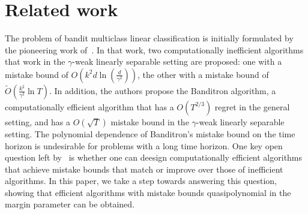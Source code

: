 \section{Related work}
\label{section:related-work}
The problem of bandit multiclass linear classification is initially formulated
 by the pioneering work of~\cite{Kakade-Shalev-Shwartz-Tewari-2008}. In that work,
 two computationally
 inefficient algorithms that work in the $\gamma$-weak linearly separable setting are proposed: one with a mistake bound of
 $O(k^2 d \ln(\frac{d}{\gamma^2}))$, the other with a mistake bound of $\tilde{O}(\frac{k^2}{\gamma^2} \ln T)$.
 In addition, the authors propose the Banditron algorithm, a computationally efficient
 algorithm that has a $O(T^{2/3})$ regret in the general setting, and has a
 $O(\sqrt{T})$ mistake bound in the $\gamma$-weak linearly separable setting.
The polynomial dependence of Banditron's mistake bound on the time horizon is undesirable
for problems with a long time horizon.
 One key open question left by~\cite{Kakade-Shalev-Shwartz-Tewari-2008} is whether
 one can deesign computationally efficient algorithms that achieve mistake bounds that match or improve over those of inefficient algorithms.
 In this paper, we take a step towards answering this question, showing that
 efficient algorithms with mistake bounds quasipolynomial in the margin parameter can be obtained.


